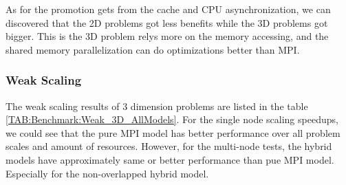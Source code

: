 As for the promotion gets from the cache and CPU asynchronization, we can discovered that the 2D problems got less benefits 
while the 3D problems got bigger.
This is the 3D problem relys more on the memory accessing, and the shared memory parallelization can do optimizations better than MPI.

\subsubsection{Weak Scaling}

The weak scaling results of 3 dimension problems are listed in the table \ref{TAB:Benchmark:Weak_3D_AllModels}.
For the single node scaling speedups, we could see that the pure MPI model has better performance over all problem scales 
and amount of resources.
However, for the multi-node tests, the hybrid models have approximately same or better performance than pue MPI model.
Especially for the non-overlapped hybrid model.






